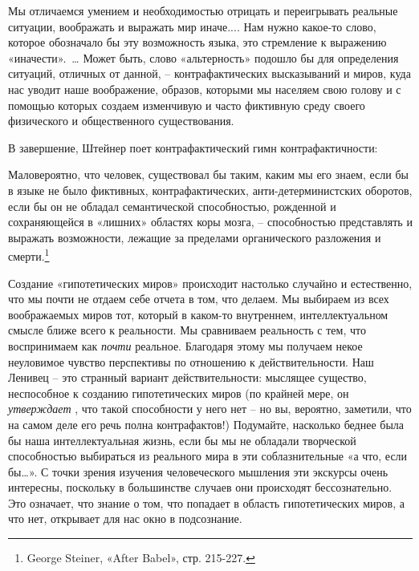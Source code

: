 \documentclass[../main.tex]{subfiles}
\begin{document}
Мы отличаемся умением и необходимостью отрицать и переигрывать реальные ситуации, воображать и выражать мир иначе.... Нам нужно какое-то слово, которое обозначало бы эту возможность языка, это стремление к выражению «иначести».~\ldots{} Может быть, слово «альтерность» подошло бы для определения ситуаций, отличных от данной, \--- контрафактических высказываний и миров, куда нас уводит наше воображение, образов, которыми мы населяем свою голову и с помощью которых создаем изменчивую и часто фиктивную среду своего физического и общественного существования.

В завершение, Штейнер поет контрафактический гимн контрафактичности:

Маловероятно, что человек, существовал бы таким, каким мы его знаем, если бы в языке не было фиктивных, контрафактических, анти-детерминистских оборотов, если бы он не обладал семантической способностью, рожденной и сохраняющейся в «лишних» областях коры мозга, \--- способностью представлять и выражать возможности, лежащие за пределами органического разложения и смерти.\footnote{George Steiner, «After Babel», стр. 215-227.}

Создание «гипотетических миров» происходит настолько случайно и естественно, что мы почти не отдаем себе отчета в том, что делаем. Мы выбираем из всех воображаемых миров тот, который в каком-то внутреннем, интеллектуальном смысле ближе всего к реальности. Мы сравниваем реальность с тем, что воспринимаем как \emph{почти} реальное. Благодаря этому мы получаем некое неуловимое чувство перспективы по отношению к действительности. Наш Ленивец \--- это странный вариант действительности: мыслящее существо, неспособное к созданию гипотетических миров (по крайней мере, он \emph{утверждает} , что такой способности у него нет \--- но вы, вероятно, заметили, что на самом деле его речь полна контрафактов!) Подумайте, насколько беднее была бы наша интеллектуальная жизнь, если бы мы не обладали творческой способностью выбираться из реального мира в эти соблазнительные «а что, если бы\ldots». С точки зрения изучения человеческого мышления эти экскурсы очень интересны, поскольку в большинстве случаев они происходят бессознательно. Это означает, что знание о том, что попадает в область гипотетических миров, а что нет, открывает для нас окно в подсознание.
\end{document}
